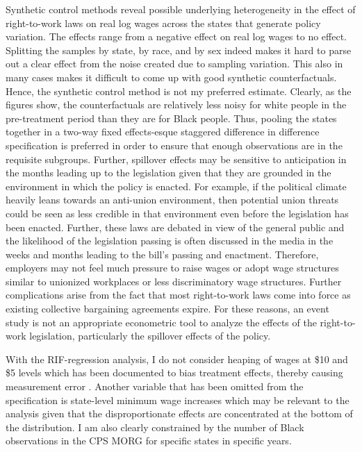 \documentclass[11pt]{article}
\begin{document}
Synthetic control methods reveal possible underlying heterogeneity in the effect of right-to-work laws on real log wages across the states that generate policy variation. The effects range from a negative effect on real log wages to no effect. Splitting the samples by state, by race, and by sex indeed makes it hard to parse out a clear effect from the noise created due to sampling variation. This also in many cases makes it difficult to come up with good synthetic counterfactuals. Hence, the synthetic control method is not my preferred estimate. Clearly, as the figures show, the counterfactuals are relatively less noisy for white people in the pre-treatment period than they are for Black people. Thus, pooling the states together in a two-way fixed effects-esque staggered difference in difference specification is preferred in order to ensure that enough observations are in the requisite subgroups. Further, spillover effects may be sensitive to anticipation in the months leading up to the legislation given that they are grounded in the environment in which the policy is enacted. For example, if the political climate heavily leans towards an anti-union environment, then potential union threats could be seen as less credible in that environment even before the legislation has been enacted. Further, these laws are debated in view of the general public and the likelihood of the legislation passing is often discussed in the media in the weeks and months leading to the bill's passing and enactment. Therefore, employers may not feel much pressure to raise wages or adopt wage structures similar to unionized workplaces or less discriminatory wage structures. Further complications arise from the fact that most right-to-work laws come into force as existing collective bargaining agreements expire. For these reasons, an event study is not an appropriate econometric tool to analyze the effects of the right-to-work legislation, particularly the spillover effects of the policy. 

With the RIF-regression analysis, I do not consider heaping of wages at \$10 and \$5 levels which has been documented to bias treatment effects, thereby causing measurement error \citep[see, for example][]{fll2021, ams2016}. Another variable that has been omitted from the specification is state-level minimum wage increases which may be relevant to the analysis given that the disproportionate effects are concentrated at the bottom of the distribution. I am also clearly constrained by the number of Black observations in the CPS MORG for specific states in specific years.
\end{document}
